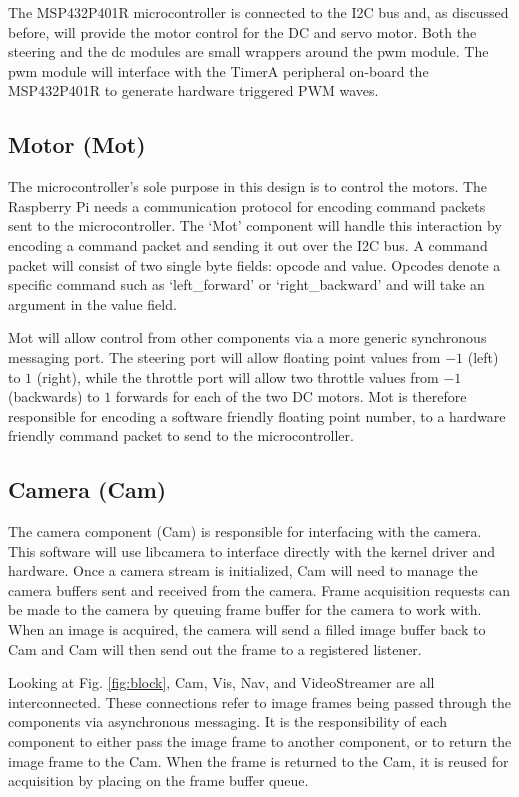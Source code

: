 \documentclass{article}
\begin{document}
The MSP432P401R microcontroller is connected to the I2C bus and, as discussed before, will provide the motor control for the DC and servo motor. Both the steering and the dc modules are small wrappers around the pwm module. The pwm module will interface with the TimerA peripheral on-board the MSP432P401R to generate hardware triggered PWM waves.

\subsection{Motor (Mot)}

The microcontroller's sole purpose in this design is to control the motors. The Raspberry Pi needs a communication protocol for encoding command packets sent to the microcontroller. The `Mot' component will handle this interaction by encoding a command packet and sending it out over the I2C bus. A command packet will consist of two single byte fields: opcode and value. Opcodes denote a specific command such as `left\_forward' or `right\_backward' and will take an argument in the value field.

Mot will allow control from other components via a more generic synchronous
messaging port. The steering port will allow floating point values from $-1$ (left) to $1$ (right), while the throttle port will allow two throttle values from $-1$ (backwards) to $1$ forwards for each of the two DC motors. Mot is therefore responsible for encoding a software friendly floating point number, to a hardware friendly command packet to send to the microcontroller.

\subsection{Camera (Cam)}

The camera component (Cam) is responsible for interfacing with the camera. This software will use libcamera to interface directly with the kernel driver and hardware. Once a camera stream is initialized, Cam will need to manage the camera buffers sent and received from the camera. Frame acquisition requests can be made to the camera by queuing frame buffer for the camera to work with. When an image is acquired, the camera will send a filled image buffer back to Cam and Cam will then send out the frame to a registered listener.

Looking at Fig. \ref{fig:block}, Cam, Vis, Nav, and VideoStreamer are all interconnected. These connections refer to image frames being passed through the components via asynchronous messaging. It is the responsibility of each component to either pass the image frame to another component, or to return the image frame to the Cam. When the frame is returned to the Cam, it is reused for acquisition by placing on the frame buffer queue.
\end{document}
